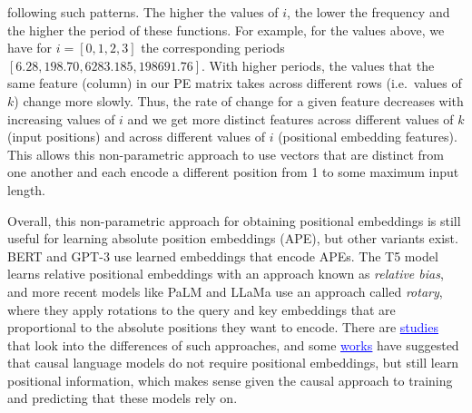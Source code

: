 \documentclass[11pt,a4paper]{article}
\begin{document}
\begin{enumerate}[label=(\alph*)]
\begin{enumerate}[label=(\roman*)]
                    following such patterns.
                    The higher the values of $i$, the lower the frequency and
                    the higher the period of these functions.
                    For example, for the values above, we have for
                    $i = [0, 1, 2, 3]$ the corresponding periods
                    $[6.28, 198.70, 6283.185, 198691.76]$.
                    With higher periods, the values that the same feature (column) in
                    our PE matrix takes across different rows (i.e.\ values of $k$)
                    change more slowly.
                    Thus, the rate of change for a given feature decreases with
                    increasing values of $i$ and we get more distinct features
                    across different values of $k$ (input positions) and across
                    different values of $i$ (positional embedding features).
                    This allows this non-parametric approach to use vectors
                    that are distinct from one another and each encode a
                    different position from 1 to some maximum input length.

                    Overall, this non-parametric approach for obtaining
                    positional embeddings is still useful for learning absolute
                    position embeddings (APE), but other variants exist.
                    BERT and GPT-3 use learned embeddings that encode APEs.
                    The T5 model learns relative positional embeddings with an
                    approach known as \emph{relative bias}, and more recent
                    models like PaLM and LLaMa use an approach called
                    \emph{rotary}, where they apply rotations to the query and
                    key embeddings that are proportional to the absolute
                    positions they want to encode.
                    There are
                    \href{https://arxiv.org/pdf/2305.19466.pdf}{\textcolor{blue}{\underline{studies}}}
                    that look into the differences of such approaches, and some
                    \href{https://aclanthology.org/2022.findings-emnlp.99.pdf}{\textcolor{blue}{\underline{works}}}
                    have suggested that causal language models do not require
                    positional embeddings, but still learn positional
                    information, which makes sense given the causal approach
                    to training and predicting that these models rely on.
          \end{enumerate}
\end{enumerate}
\end{document}
